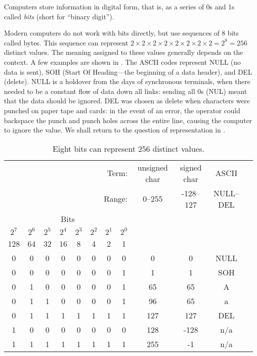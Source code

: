 Computers store information in digital form, that is, as a series of
0s and 1s called \emph{bits} (short for ``binary digit'').

Modern computers do not work with bits directly, but use sequences of
8 bits called bytes. This sequence can represent
$2\times2\times2\times2\times2\times2\times2\times2=2^8=256$ distinct
values. The meaning assigned to these values generally depends on the
context. A few examples are shown in . The ASCII
codes represent NULL (no data is sent), SOH (Start Of Heading---the
beginning of a data header), and DEL (delete). NULL is a holdover from
the days of synchronous terminals, when there needed to be a constant
flow of data down all links: sending all 0s (NUL) meant that the data
should be ignored. DEL was chosen as delete when characters were
punched on paper tape and cards: in the event of an error, the
operator could backspace the punch and punch holes across the entire
line, causing the computer to ignore the value. We shall return
to the question of representation in .

\begin{table}
\begin{tabular}{cccccccc|c|c|c|c}
\multicolumn{8}{r}{                       Term:}  & unsigned char & signed char & ASCII \\
\multicolumn{8}{r}{                       Range:} & 0--255      & -128--127 & NULL--DEL\\
\cline{9-11}\multicolumn{8}{c}{Bits}                          &        &               &             &          \\
$2^7$ & $2^6$ & $2^5$ & $2^4$ & $2^3$ & $2^2$ & $2^1$ & $2^0$  &        &               &             &          \\
  128 &    64 &   32 &    16 &     8 &     4 &     2 &     1  &        &               &             &          \\
\hline
    0 &     0 &    0 &     0 &     0 &     0 &     0 &     0 &            0  &            0  &   NULL     \\
    0 &     0 &    0 &     0 &     0 &     0 &     0 &     1 &            1  &            1  &   SOH      \\
    0 &     1 &    0 &     0 &     0 &     0 &     0 &     1 &           65  &           65  &   A        \\
    0 &     1 &    1 &     0 &     0 &     0 &     0 &     1 &           96  &           65  &   a        \\
    0 &     1 &    1 &     1 &     1 &     1 &     1 &     1 &           127 &          127  &   DEL      \\
    1 &     0 &    0 &     0 &     0 &     0 &     0 &     0 &           128 &         -128  &   n/a      \\
    1 &     1 &    1 &     1 &     1 &     1 &     1 &     1 &           255 &           -1  &   n/a      \\
\end{tabular}
\caption{Eight bits can represent 256 distinct values.}\label{tab:8bits}
\end{table}

